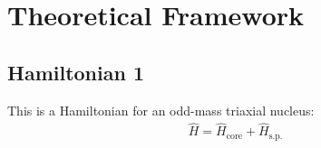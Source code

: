 \chapter{Theoretical Framework}

\section{Hamiltonian 1}

This is a Hamiltonian for an odd-mass triaxial nucleus:
\begin{align}
    \hat{H}=\hat{H}_\text{core}+\hat{H}_\text{s.p.}
\end{align}

\lipsum[1-2]